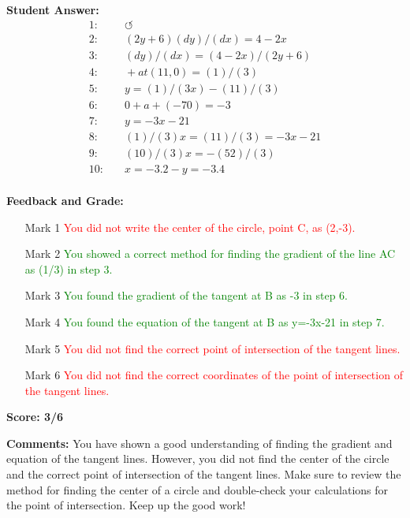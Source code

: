 \documentclass{article}
\begin{document}
\textbf{Student Answer:}
\begin{align*}
1: & \quad ↺ \\
2: & \quad (2y+6)(dy)/(dx)=4-2x \\
3: & \quad (dy)/(dx)=(4-2x)/(2y+6) \\
4: & \quad +at(11,0)=(1)/(3) \\
5: & \quad y=(1)/(3x)-(11)/(3) \\
6: & \quad 0 +a+(-70)=-3 \\
7: & \quad y=-3x-21 \\
8: & \quad (1)/(3)x=(11)/(3)=-3x-21 \\
9: & \quad (10)/(3)x=-(52)/(3) \\
10: & \quad x=-3.2-y=-3.4 \\
\end{align*}

\textbf{Feedback and Grade:}
\begin{itemize}
\item[Mark 1] \textcolor{red}{You did not write the center of the circle, point C, as (2,-3).}
\item[Mark 2] \textcolor{green}{You showed a correct method for finding the gradient of the line AC as (1/3) in step 3.}
\item[Mark 3] \textcolor{green}{You found the gradient of the tangent at B as -3 in step 6.}
\item[Mark 4] \textcolor{green}{You found the equation of the tangent at B as y=-3x-21 in step 7.}
\item[Mark 5] \textcolor{red}{You did not find the correct point of intersection of the tangent lines.}
\item[Mark 6] \textcolor{red}{You did not find the correct coordinates of the point of intersection of the tangent lines.}
\end{itemize}

\textbf{Score: 3/6}

\textbf{Comments:} You have shown a good understanding of finding the gradient and equation of the tangent lines. However, you did not find the center of the circle and the correct point of intersection of the tangent lines. Make sure to review the method for finding the center of a circle and double-check your calculations for the point of intersection. Keep up the good work!
\end{document}

